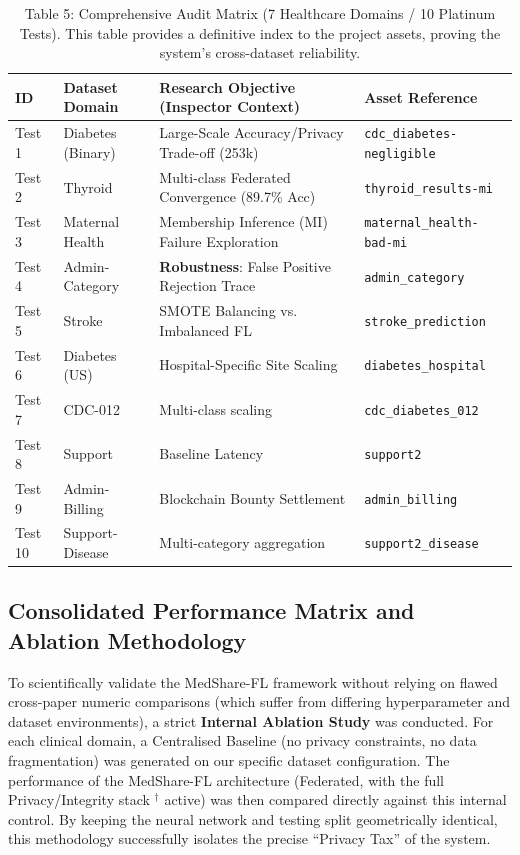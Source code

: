 \documentclass[10pt, a4paper, twocolumn]{article}
\begin{document}
\begin{table}[hbt!]
\centering
\scriptsize
\begin{tabular}{lp{2.5cm}p{5.5cm}l}
\toprule
\textbf{ID} & \textbf{Dataset Domain} & \textbf{Research Objective (Inspector Context)} & \textbf{Asset Reference} \\
\midrule
Test 1 & Diabetes (Binary) & Large-Scale Accuracy/Privacy Trade-off (253k) & \texttt{cdc\_diabetes-negligible} \\
Test 2 & Thyroid & Multi-class Federated Convergence (89.7\% Acc) & \texttt{thyroid\_results-mi} \\
Test 3 & Maternal Health & Membership Inference (MI) Failure Exploration & \texttt{maternal\_health-bad-mi} \\
Test 4 & Admin-Category & \textbf{Robustness}: False Positive Rejection Trace & \texttt{admin\_category} \\
Test 5 & Stroke & SMOTE Balancing vs. Imbalanced FL & \texttt{stroke\_prediction} \\
Test 6 & Diabetes (US) & Hospital-Specific Site Scaling & \texttt{diabetes\_hospital} \\
Test 7 & CDC-012 & Multi-class scaling & \texttt{cdc\_diabetes\_012} \\
Test 8 & Support & Baseline Latency & \texttt{support2} \\
Test 9 & Admin-Billing & Blockchain Bounty Settlement & \texttt{admin\_billing} \\
Test 10 & Support-Disease & Multi-category aggregation & \texttt{support2\_disease} \\
\bottomrule
\end{tabular}
\caption{Table 5: Comprehensive Audit Matrix (7 Healthcare Domains / 10 Platinum Tests). This table provides a definitive index to the project assets, proving the system's cross-dataset reliability.}
\end{table}

\subsection{Consolidated Performance Matrix and Ablation Methodology}

To scientifically validate the MedShare-FL framework without relying on flawed cross-paper numeric comparisons (which suffer from differing hyperparameter and dataset environments), a strict \textbf{Internal Ablation Study} was conducted. For each clinical domain, a Centralised Baseline (no privacy constraints, no data fragmentation) was generated on our specific dataset configuration. The performance of the MedShare-FL architecture (Federated, with the full Privacy/Integrity stack $^\dagger$ active) was then compared directly against this internal control. By keeping the neural network and testing split geometrically identical, this methodology successfully isolates the precise ``Privacy Tax'' of the system.
\end{document}
